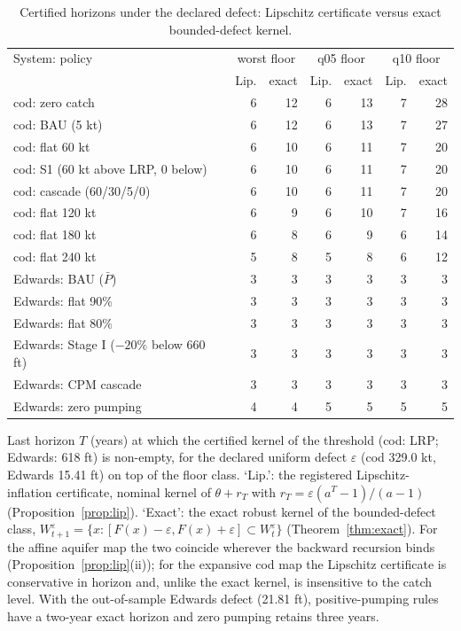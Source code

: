 \begin{table}[t]
\centering
\caption{Certified horizons under the declared defect: Lipschitz certificate versus exact bounded-defect kernel.}
\label{tab:horizons}
\small
\begin{tabular}{lrrrrrr}
\toprule
System: policy & \multicolumn{2}{c}{worst floor} & \multicolumn{2}{c}{q05 floor} & \multicolumn{2}{c}{q10 floor} \\ & Lip. & exact & Lip. & exact & Lip. & exact \\
\midrule
cod: zero catch & 6 & 12 & 6 & 13 & 7 & 28 \\
cod: BAU (5 kt) & 6 & 12 & 6 & 13 & 7 & 27 \\
cod: flat 60 kt & 6 & 10 & 6 & 11 & 7 & 20 \\
cod: S1 (60 kt above LRP, 0 below) & 6 & 10 & 6 & 11 & 7 & 20 \\
cod: cascade (60/30/5/0) & 6 & 10 & 6 & 11 & 7 & 20 \\
cod: flat 120 kt & 6 & 9 & 6 & 10 & 7 & 16 \\
cod: flat 180 kt & 6 & 8 & 6 & 9 & 6 & 14 \\
cod: flat 240 kt & 5 & 8 & 5 & 8 & 6 & 12 \\
\midrule
Edwards: BAU ($\bar P$) & 3 & 3 & 3 & 3 & 3 & 3 \\
Edwards: flat 90\% & 3 & 3 & 3 & 3 & 3 & 3 \\
Edwards: flat 80\% & 3 & 3 & 3 & 3 & 3 & 3 \\
Edwards: Stage I ($-20\%$ below 660 ft) & 3 & 3 & 3 & 3 & 3 & 3 \\
Edwards: CPM cascade & 3 & 3 & 3 & 3 & 3 & 3 \\
Edwards: zero pumping & 4 & 4 & 5 & 5 & 5 & 5 \\
\bottomrule
\end{tabular}
\par\smallskip\begin{minipage}{0.97\linewidth}\footnotesize Last horizon $T$ (years) at which the certified kernel of the threshold (cod: LRP; Edwards: 618 ft) is non-empty, for the declared uniform defect $\varepsilon$ (cod 329.0 kt, Edwards 15.41 ft) on top of the floor class. `Lip.': the registered Lipschitz-inflation certificate, nominal kernel of $\theta+r_T$ with $r_T=\varepsilon(a^T-1)/(a-1)$ (Proposition~\ref{prop:lip}). `Exact': the exact robust kernel of the bounded-defect class, $W^\varepsilon_{t+1}=\{x: [F(x)-\varepsilon,F(x)+\varepsilon]\subset W^\varepsilon_t\}$ (Theorem~\ref{thm:exact}). For the affine aquifer map the two coincide wherever the backward recursion binds (Proposition~\ref{prop:lip}(ii)); for the expansive cod map the Lipschitz certificate is conservative in horizon and, unlike the exact kernel, is insensitive to the catch level. With the out-of-sample Edwards defect (21.81 ft), positive-pumping rules have a two-year exact horizon and zero pumping retains three years.\end{minipage}
\end{table}
